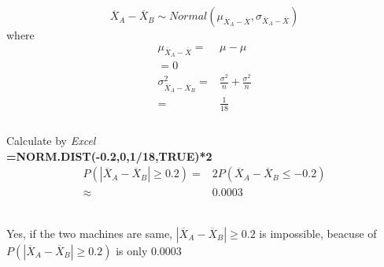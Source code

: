 \documentclass{article}
\begin{document}
    \section{}
        \subsection{}
            \paragraph{}
            $$\overline{X}_A-\overline{X}_B\sim Normal(\mu_{\overline{X}_A-\overline{X}},\sigma_{\overline{X}_A-\overline{X}})$$
            where 
            \begin{equation*}
                \begin{split}
                    \mu_{\overline{X}_A-\overline{X}}=&\mu-\mu\\
                        =0\\
                    \sigma^2_{\overline{X}_A-\overline{X}_B}=&\frac{\sigma^2}{n}+\frac{\sigma^2}{n}\\
                        =&\frac{1}{18}\\
                \end{split}
            \end{equation*}
            \paragraph{}
            Calculate by \textit{Excel}\\
            \textbf{=NORM.DIST(-0.2,0,1/18,TRUE)*2}
            \begin{equation*}
                \begin{split}
                    P(|\overline{X}_A-\overline{X}_B|\geq 0.2)=&2P(\overline{X}_A-\overline{X}_B\leq -0.2)\\
                        \approx&0.0003\\
                \end{split}
            \end{equation*}
        \subsection{}
            \paragraph{}
            Yes, if the two machines are same, $|\overline{X}_A-\overline{X}_B|\geq 0.2$ is impossible, beacuse of $P(|\overline{X}_A-\overline{X}_B|\geq 0.2)$ is only $0.0003$
\end{document}
